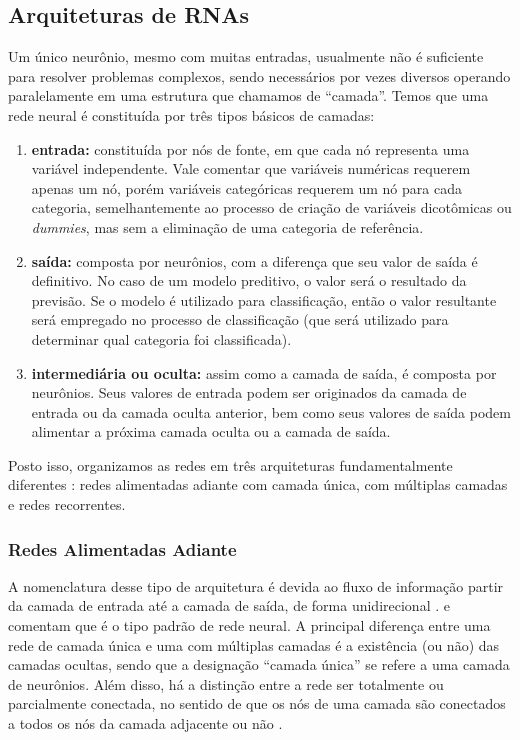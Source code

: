 \documentclass{automatextcc}
\begin{document}
\subsection{Arquiteturas de RNAs}
\label{arquitetura rna}

Um único neurônio, mesmo com muitas entradas, usualmente não é suficiente para resolver problemas complexos, sendo necessários por vezes diversos operando paralelamente em uma estrutura que chamamos de ``camada''. Temos que uma rede neural é constituída por três tipos básicos de camadas:

\begin{enumerate}
    \item \textbf{entrada:} constituída por nós de fonte, em que cada nó representa uma variável independente. Vale comentar que variáveis numéricas requerem apenas um nó, porém variáveis categóricas requerem um nó para cada categoria, semelhantemente ao processo de criação de variáveis dicotômicas ou \textit{dummies}, mas sem a eliminação de uma categoria de referência.
    \item \textbf{saída:} composta por neurônios, com a diferença que seu valor de saída é definitivo. No caso de um modelo preditivo, o valor será o resultado da previsão. Se o modelo é utilizado para classificação, então o valor resultante será empregado no processo de classificação (que será utilizado para determinar qual categoria foi classificada).
    \item \textbf{intermediária ou oculta:} assim como a camada de saída, é composta por neurônios. Seus valores de entrada podem ser originados da camada de entrada ou da camada oculta anterior, bem como seus valores de saída podem alimentar a próxima camada oculta ou a camada de saída.
\end{enumerate}
Posto isso, organizamos as redes em três arquiteturas fundamentalmente diferentes \citep{hair2005,haykin2009,hagan2014}: redes alimentadas adiante com camada única, com múltiplas camadas e redes recorrentes.



\subsubsection{Redes Alimentadas Adiante}
A nomenclatura desse tipo de arquitetura é devida ao fluxo de informação partir da camada de entrada até a camada de saída, de forma unidirecional \citep{goodfellow2016}. \citet{hastie2008} e \citet{fan2021} comentam que é o tipo padrão de rede neural. A principal diferença entre uma rede de camada única e uma com múltiplas camadas é a existência (ou não) das camadas ocultas, sendo que a designação ``camada única'' se refere a uma camada de neurônios. Além disso, há a distinção entre a rede ser totalmente ou parcialmente conectada, no sentido de que os nós de uma camada são conectados a todos os nós da camada adjacente ou não \citep{haykin2009}. 
\end{document}

